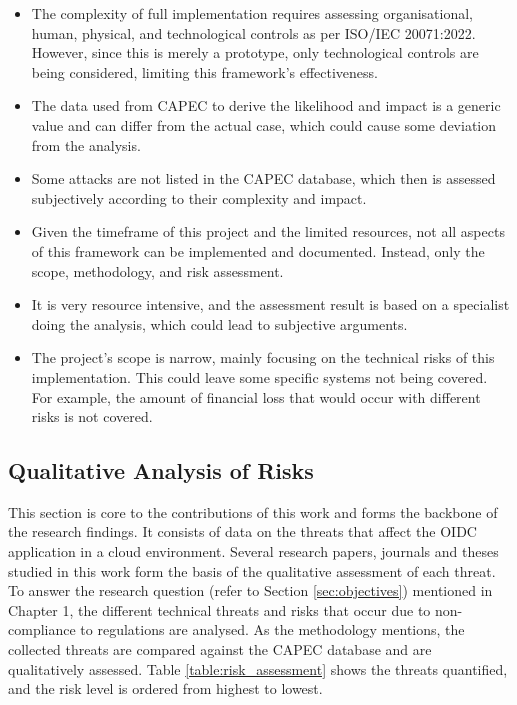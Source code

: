 \begin{itemize}
    \item The complexity of full implementation requires assessing organisational, human, physical, and technological controls as per ISO/IEC 20071:2022. However, since this is merely a prototype, only technological controls are being considered, limiting this framework's effectiveness.
    
    \item The data used from CAPEC to derive the likelihood and impact is a generic value and can differ from the actual case, which could cause some deviation from the analysis.
    
    \item Some attacks are not listed in the CAPEC database, which then is assessed subjectively according to their complexity and impact. 
    
    \item Given the timeframe of this project and the limited resources, not all aspects of this framework can be implemented and documented. Instead, only the scope, methodology, and risk assessment.
    
    \item It is very resource intensive, and the assessment result is based on a specialist doing the analysis, which could lead to subjective arguments.
    
    \item The project's scope is narrow, mainly focusing on the technical risks of this implementation. This could leave some specific systems not being covered. For example, the amount of financial loss that would occur with different risks is not covered.

\end{itemize}

\subsection{Qualitative Analysis of Risks}
 This section is core to the contributions of this work and forms the backbone of the research findings.
 It consists of data on the threats that affect the OIDC application in a cloud environment.
 Several research papers, journals and theses studied in this work form the basis of the qualitative assessment of each threat.
 To answer the research question (refer to Section \ref{sec:objectives}) mentioned in Chapter 1, the different technical threats and risks that occur due to non-compliance to regulations are analysed.
 As the methodology mentions, the collected threats are compared against the CAPEC database and are qualitatively assessed.
 Table \ref{table:risk_assessment} shows the threats quantified, and the risk level is ordered from highest to lowest. 

